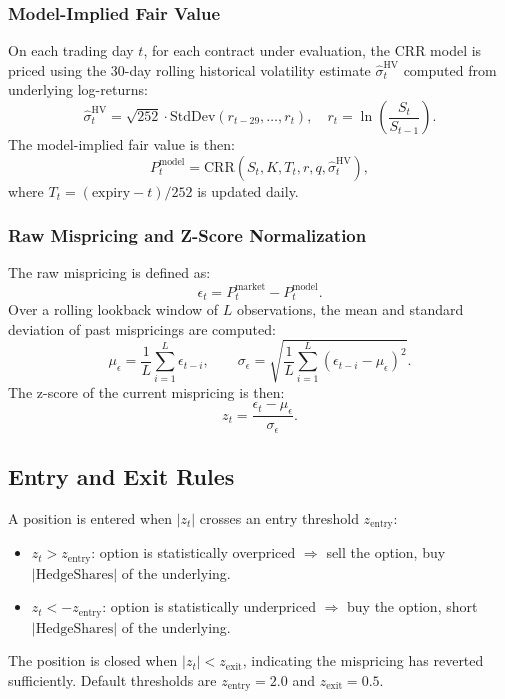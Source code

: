 \documentclass[10pt,twocolumn]{article}
\begin{document}
\subsubsection{Model-Implied Fair Value}

On each trading day $t$, for each contract under evaluation, the CRR model
is priced using the 30-day rolling historical volatility estimate
$\hat{\sigma}_t^{\text{HV}}$ computed from underlying log-returns:
%
\begin{equation}
\hat{\sigma}_t^{\text{HV}} = \sqrt{252} \cdot
\text{StdDev}\!\left(r_{t-29}, \ldots, r_t\right), \quad
r_t = \ln\!\left(\frac{S_t}{S_{t-1}}\right).
\end{equation}
%
The model-implied fair value is then:
%
\begin{equation}
P_t^{\text{model}} = \text{CRR}\!\left(S_t, K, T_t, r,
                     q, \hat{\sigma}_t^{\text{HV}}\right),
\end{equation}
%
where $T_t = (\text{expiry} - t) / 252$ is updated daily.

\subsubsection{Raw Mispricing and Z-Score Normalization}

The raw mispricing is defined as:
%
\begin{equation}
\epsilon_t = P_t^{\text{market}} - P_t^{\text{model}}.
\end{equation}
%
Over a rolling lookback window of $L$ observations, the mean and standard
deviation of past mispricings are computed:
%
\begin{equation}
\mu_\epsilon = \frac{1}{L}\sum_{i=1}^{L}\epsilon_{t-i}, \qquad
\sigma_\epsilon = \sqrt{\frac{1}{L}\sum_{i=1}^{L}
                 (\epsilon_{t-i}-\mu_\epsilon)^2}.
\end{equation}
%
The z-score of the current mispricing is then:
%
\begin{equation}
z_t = \frac{\epsilon_t - \mu_\epsilon}{\sigma_\epsilon}.
\end{equation}

\subsection{Entry and Exit Rules}

A position is entered when $|z_t|$ crosses an entry threshold
$z_{\text{entry}}$:
\begin{itemize}[noitemsep]
  \item $z_t > z_{\text{entry}}$: option is statistically overpriced
        $\Rightarrow$ sell the option, buy $|\text{HedgeShares}|$
        of the underlying.
  \item $z_t < -z_{\text{entry}}$: option is statistically underpriced
        $\Rightarrow$ buy the option, short $|\text{HedgeShares}|$
        of the underlying.
\end{itemize}
The position is closed when $|z_t| < z_{\text{exit}}$, indicating the
mispricing has reverted sufficiently. Default thresholds are
$z_{\text{entry}} = 2.0$ and $z_{\text{exit}} = 0.5$.
\end{document}

